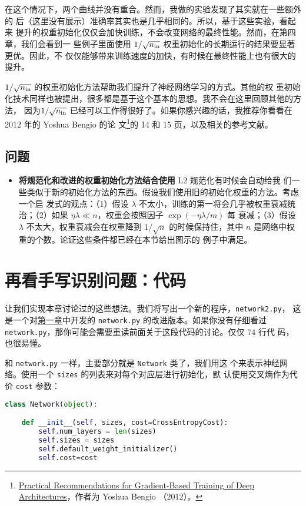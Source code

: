 在这个情况下，两个曲线并没有重合。然而，我做的实验发现了其实就在一些额外的%
\epochs{}后（这里没有展示）准确率其实也是几乎相同的。所以，基于这些实验，看起来
提升的权重初始化仅仅会加快训练，不会改变网络的最终性能。然而，在第四章，我们会看到一
些例子里面使用 $1/\sqrt{n_{\rm in}}$ 权重初始化的长期运行的结果要显著更优。因此，不
仅仅能够带来训练速度的加快，有时候在最终性能上也有很大的提升。

$1/\sqrt{n_{\rm in}}$ 的权重初始化方法帮助我们提升了神经网络学习的方式。其他的权
重初始化技术同样也被提出，很多都是基于这个基本的思想。我不会在这里回顾其他的方法，
因为$1/\sqrt{n_{\rm in}}$ 已经可以工作得很好了。如果你感兴趣的话，我推荐你看看在
2012 年的 Yoshua Bengio 的论
文\footnote{\href{http://arxiv.org/pdf/1206.5533v2.pdf}{Practical
    Recommendations for Gradient-Based Training of Deep Architectures}，作者为
  Yoshua Bengio （2012）。}的 14 和 15 页，以及相关的参考文献。

\subsection*{问题}

\begin{itemize}
\item \textbf{将规范化和改进的权重初始化方法结合使用} L2 规范化有时候会自动给我
  们一些类似于新的初始化方法的东西。假设我们使用旧的初始化权重的方法。考虑一个启
  发式的观点：（1）假设 $\lambda$ 不太小，训练的第一\epochs{}将会几乎被权重衰减统
  治；（2）如果 $\eta \lambda \ll n$，权重会按照因子 $\exp(-\eta \lambda / m)$ 每
  \epochs{}衰减；（3）假设 $\lambda$ 不太大，权重衰减会在权重降到 $1/\sqrt{n}$
  的时候保持住，其中 $n$ 是网络中权重的个数。论证这些条件都已经在本节给出图示的
  例子中满足。
\end{itemize}

\section{再看手写识别问题：代码}
\label{sec:handwriting_recognition_revisited_the_code}

让我们实现本章讨论过的这些想法。我们将写出一个新的程序，\lstinline!network2.py!，
这是一个对\hyperref[sec:implementing_our_network_to_classify_digits]{第一章}中开发的 \lstinline!network.py! 的改进版本。如果你没有仔细看过
\lstinline!network.py!，那你可能会需要重读前面关于这段代码的讨论。仅仅 $74$ 行代
码，也很易懂。

和 \lstinline!network.py! 一样，主要部分就是 \lstinline!Network! 类了，我们用这
个来表示神经网络。使用一个 \lstinline!sizes! 的列表来对每个对应层进行初始化，默
认使用交叉熵作为代价 \lstinline!cost! 参数：
\begin{lstlisting}[language=Python]
class Network(object):

    def __init__(self, sizes, cost=CrossEntropyCost):
        self.num_layers = len(sizes)
        self.sizes = sizes
        self.default_weight_initializer()
        self.cost=cost
\end{lstlisting}

